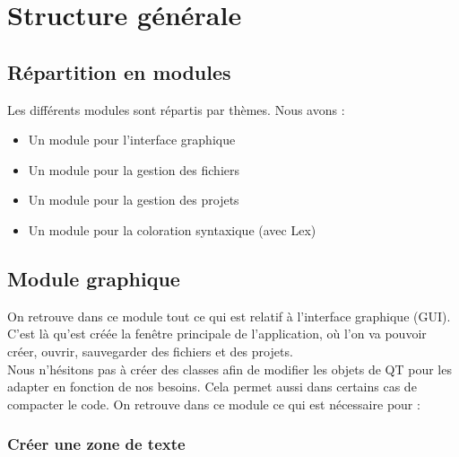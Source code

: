 \documentclass[a4paper,12pt]{article}
\begin{document}
\section{Structure générale}

	\subsection{Répartition en modules}
	
		Les différents modules sont répartis par thèmes. Nous avons :
		\begin{itemize}
			\item Un module pour l'interface graphique
			\item Un module pour la gestion des fichiers
			\item Un module pour la gestion des projets
			\item Un module pour la coloration syntaxique (avec Lex)
		\end{itemize}
		
	\subsection{Module graphique}
	
		On retrouve dans ce module tout ce qui est relatif à l'interface graphique (GUI).\\
		C'est là qu'est créée la fenêtre principale de l'application, où l'on va pouvoir créer, ouvrir, sauvegarder des fichiers et des projets.\\
		Nous n'hésitons pas à créer des classes afin de modifier les objets de QT pour les adapter en fonction de nos besoins. Cela permet aussi dans certains cas de compacter le code.
		On retrouve dans ce module ce qui est nécessaire pour :
	
			\subsubsection*{Créer une zone de texte}
			
\end{document}
